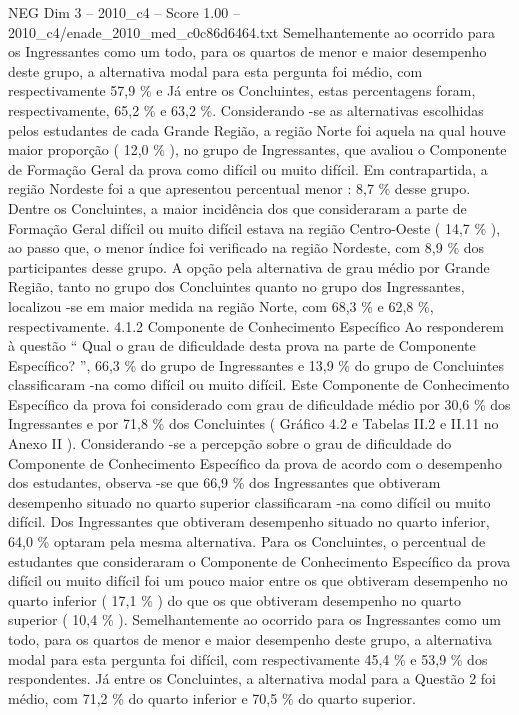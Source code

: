 \begin{textsample}{NEG Dim 3 – 2010\_c4 – Score 1.00 – 2010\_c4/enade\_2010\_med\_c0c86d6464.txt}
Semelhantemente ao ocorrido para os Ingressantes como um todo, para os quartos de menor e maior desempenho deste grupo, a alternativa modal para esta pergunta foi médio, com respectivamente 57,9 \% e Já entre os Concluintes, estas percentagens foram, respectivamente, 65,2 \% e 63,2 \%.
Considerando -se as alternativas escolhidas pelos estudantes de cada Grande Região, a região Norte foi aquela na qual houve maior proporção ( 12,0 \% ), no grupo de Ingressantes, que avaliou o Componente de Formação Geral da prova como difícil ou muito difícil.
Em contrapartida, a região Nordeste foi a que apresentou percentual menor : 8,7 \% desse grupo.
Dentre os Concluintes, a maior incidência dos que consideraram a parte de Formação Geral difícil ou muito difícil estava na região Centro-Oeste ( 14,7 \% ), ao passo que, o menor índice foi verificado na região Nordeste, com 8,9 \% dos participantes desse grupo.
A opção pela alternativa de grau médio por Grande Região, tanto no grupo dos Concluintes quanto no grupo dos Ingressantes, localizou -se em maior medida na região Norte, com 68,3 \% e 62,8 \%, respectivamente. 4.1.2 Componente de Conhecimento Específico Ao responderem à questão “ Qual o grau de dificuldade desta prova na parte de Componente Específico? ”, 66,3 \% do grupo de Ingressantes e 13,9 \% do grupo de Concluintes classificaram -na como difícil ou muito difícil.
Este Componente de Conhecimento Específico da prova foi considerado com grau de dificuldade médio por 30,6 \% dos Ingressantes e por 71,8 \% dos Concluintes ( Gráfico 4.2 e Tabelas II.2 e II.11 no Anexo II ).
Considerando -se a percepção sobre o grau de dificuldade do Componente de Conhecimento Específico da prova de acordo com o desempenho dos estudantes, observa -se que 66,9 \% dos Ingressantes que obtiveram desempenho situado no quarto superior classificaram -na como difícil ou muito difícil.
Dos Ingressantes que obtiveram desempenho situado no quarto inferior, 64,0 \% optaram pela mesma alternativa.
Para os Concluintes, o percentual de estudantes que consideraram o Componente de Conhecimento Específico da prova difícil ou muito difícil foi um pouco maior entre os que obtiveram desempenho no quarto inferior ( 17,1 \% ) do que os que obtiveram desempenho no quarto superior ( 10,4 \% ).
Semelhantemente ao ocorrido para os Ingressantes como um todo, para os quartos de menor e maior desempenho deste grupo, a alternativa modal para esta pergunta foi difícil, com respectivamente 45,4 \% e 53,9 \% dos respondentes.
Já entre os Concluintes, a alternativa modal para a Questão 2 foi médio, com 71,2 \% do quarto inferior e 70,5 \% do quarto superior.

\end{textsample}
